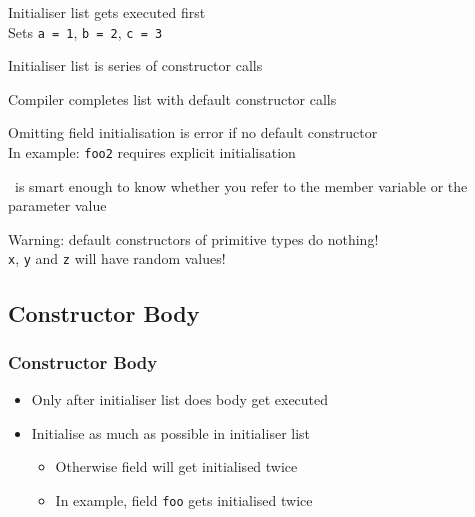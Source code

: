 \begin{frame}
\begin{overprint}
  \end{overprint}

  \begin{overprint}
    \begin{center}
      Initialiser list gets executed first \\
      Sets \texttt{a = 1}, \texttt{b = 2}, \texttt{c = 3}
    \end{center}

    \begin{center}
      Initialiser list is series of constructor calls
    \end{center}

    \begin{center}
      Compiler completes list with default constructor calls
    \end{center}

    \begin{center}
      Omitting field initialisation is error if no default constructor \\
      In example: \texttt{foo2} requires explicit initialisation
    \end{center}

    \begin{center}
      \cpp\ is smart enough to know whether you refer to the member
      variable or the parameter value
    \end{center}

    \begin{center}
      Warning: default constructors of primitive types do nothing! \\
      \texttt{x}, \texttt{y} and \texttt{z} will have random values!
    \end{center}
  \end{overprint}
\end{frame}

\subsection{Constructor Body}
\frame{\tableofcontents[currentsubsection]}

\begin{frame}
  \frametitle{Constructor Body}
  \begin{itemize}
    \item Only after initialiser list does body get executed
    \item Initialise as much as possible in initialiser list
          \begin{itemize}
            \item Otherwise field will get initialised twice
            \item In example, field \texttt{foo} gets initialised twice
          \end{itemize}
  \end{itemize}
\end{frame}

